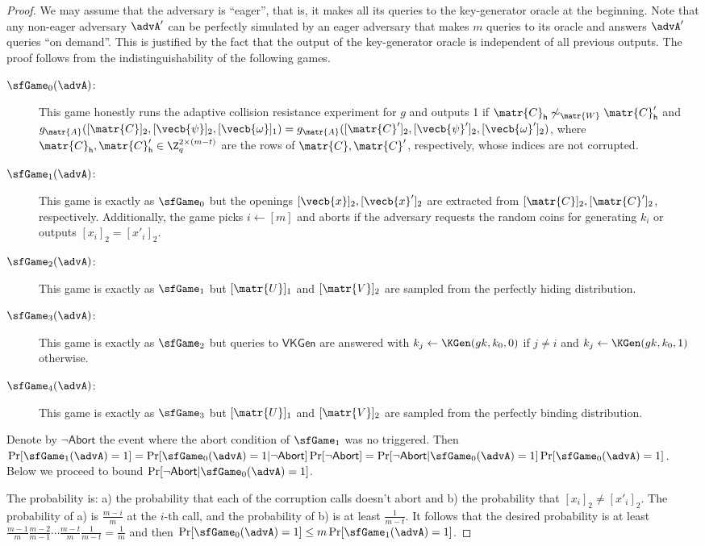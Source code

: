 \begin{proof}
We may assume that the adversary is ``eager'', that is, it makes all its queries to the key-generator oracle at the beginning. Note that any non-eager adversary $\advA'$ can be perfectly simulated  by an eager adversary that makes $m$ queries to its oracle and answers $\advA'$ queries ``on demand''. This is justified by the fact that the output of the key-generator oracle is independent of all previous outputs.
The proof follows from the indistinguishability of the following games.
\begin{description}
\item[$\sfGame_0(\advA)$:] This game honestly runs the adaptive collision resistance experiment for $g$ and outputs 1 if $\matr{C}_\mathsf{h} \not\sim_\matr{W} \matr{C}'_\mathsf{h}$ and $g_\matr{A}([\matr{C}]_2,[\vecb{\psi}]_2,[\vecb{\omega}]_1)=g_{\matr{A}}([\matr{C}']_2,[\vecb{\psi}']_2,\allowbreak[\vecb{\omega}']_2)$, where $\matr{C}_\mathsf{h}, \matr{C}'_\mathsf{h}\in\Z_q^{2\times(m-t)}$ are the rows of $\matr{C}, \matr{C}'$, respectively, whose indices are not corrupted.
\item[$\sfGame_1(\advA)$:] This game is exactly as $\sfGame_0$ but the openings $[\vecb{x}]_2,[\vecb{x}']_2$ are extracted from $[\matr{C}]_2,[\matr{C}']_2$, respectively. Additionally, the game picks $i\gets[m]$ and aborts if the adversary requests the random coins for generating $k_i$ or outputs $[x_i]_2=[x'_i]_2$.
\item[$\sfGame_2(\advA)$:] This game is exactly as $\sfGame_1$ but $[\matr{U}]_1$ and $[\matr{V}]_2$ are sampled from the perfectly hiding distribution.
\item[$\sfGame_3(\advA)$:] This game is exactly as $\sfGame_2$ but queries to $\mathsf{VKGen}$ are answered with $k_j\gets\KGen(gk,k_0,0)$ if $j\neq i$ and $k_j\gets\KGen(gk,k_0,1)$ otherwise.
\item[$\sfGame_4(\advA)$:] This game is exactly as $\sfGame_3$ but $[\matr{U}]_1$ and $[\matr{V}]_2$ are sampled from the perfectly binding distribution.
\end{description}
Denote by $\neg\mathsf{Abort}$ the event where the abort condition of $\sfGame_1$ was no triggered. Then
$\Pr[\sfGame_1(\advA)=1] = \Pr[\sfGame_0(\advA)=1|\neg\mathsf{Abort}]\Pr[\neg\mathsf{Abort}]=\Pr[\neg\mathsf{Abort}|\allowbreak \sfGame_0(\advA)=1]\Pr[\sfGame_0(\advA)=1]$.
Below we proceed to bound $\Pr[\neg\mathsf{Abort}|\allowbreak\sfGame_0(\advA)=1]$.

The probability is: a) the probability that each of the corruption calls doesn't abort and b) the probability that $[x_i]_2\neq[x'_i]_2$. The probability of a) is $\frac{m-i}{m}$ at the $i$-th call, and the probability of b) is at least $\frac{1}{m-t}$. It follows that the desired probability is at least $\frac{m-1}{m}\frac{m-2}{m-1}\cdots\frac{m-t}{m}\frac{1}{m-t}=\frac{1}{m}$ and then $\Pr[\sfGame_0(\advA)=1]\leq m \Pr[\sfGame_1(\advA)=1]$.


\end{proof}
